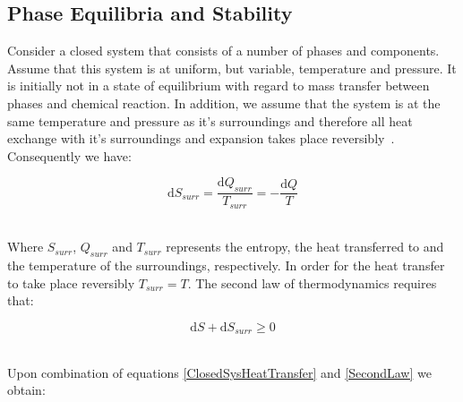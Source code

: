 \subsection{Phase Equilibria and Stability} \label{PhaseEqStabilitySection}

Consider a closed system that consists of a number of phases and components. Assume that this system is at uniform, but variable, temperature and pressure. It is initially not in a state of equilibrium with regard to mass transfer between phases and chemical reaction. In addition, we assume that the system is at the same temperature and pressure as it's surroundings and therefore all heat exchange with it's surroundings and expansion takes place reversibly~\cite{ SmithNessAbbott}.\\

Consequently we have:\

\begin{equation}
\mathrm{d}S_{surr} = \frac{\mathrm{d}Q_{surr}}{T_{surr}} = -\frac{\mathrm{d}Q}{T} \label{ClosedSysHeatTransfer}
\end{equation}\


Where $S_{surr}$,  $Q_{surr}$ and $T_{surr}$  represents the entropy, the heat transferred to and the temperature of the surroundings, respectively. In order for the heat transfer to take place reversibly $T_{surr} = T$. The second law of thermodynamics requires that:\

\begin{equation}
\mathrm{d}S + \mathrm{d}S_{surr} \geq 0 \label{SecondLaw}
\end{equation}\

Upon combination of equations \ref{ClosedSysHeatTransfer} and \ref{SecondLaw} we obtain:

